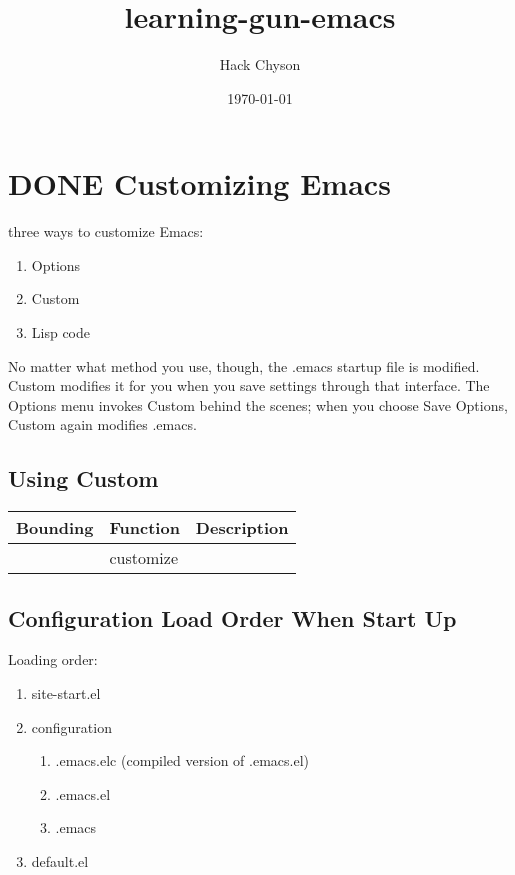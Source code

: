 \documentclass[11pt]{article}
\author{Hack Chyson}
\date{\today}
\title{learning-gun-emacs}
\begin{document}
\maketitle
\tableofcontents

\section{{\bfseries\sffamily DONE} Customizing Emacs}
\label{sec-1}
three ways to customize Emacs: \\
\begin{enumerate}
\item Options \\
\item Custom \\
\item Lisp code \\
\end{enumerate}

No matter what method you use, though, the .emacs startup file is modified. Custom modifies it for you when you save settings through that interface. The Options menu invokes Custom behind the scenes; when you choose Save Options, Custom again modifies .emacs. \\

\subsection{Using Custom}
\label{sec-1-1}
\begin{center}
\begin{tabular}{lll}
Bounding & Function & Description\\
\hline
 & customize & \\
\end{tabular}
\end{center}


\subsection{Configuration Load Order When Start Up}
\label{sec-1-2}
Loading order: \\
\begin{enumerate}
\item site-start.el \\
\item configuration \\
\begin{enumerate}
\item .emacs.elc (compiled version of .emacs.el) \\
\item .emacs.el \\
\item .emacs \\
\end{enumerate}
\item default.el \\
\end{enumerate}
\end{document}
